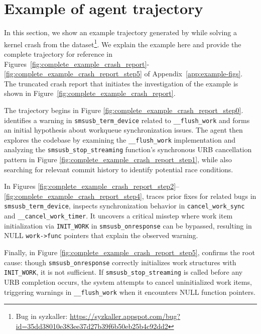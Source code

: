 \section{Example of agent trajectory}%
\label{app:examples}

In this section, we show an example \analysisphase{} trajectory generated by \cresearcher{} while solving a kernel crash from the dataset\footnote{Bug in syzkaller: \url{https://syzkaller.appspot.com/bug?id=35dd38010e383ee37d27b39f6b50eb25b4c92dd2}}.
We explain the example here and provide the complete trajectory for reference in Figures~\ref{fig:complete_example_crash_report}-\ref{fig:complete_example_crash_report_step5} of Appendix~\ref{app:example-figs}.
The truncated crash report that initiates the investigation of the example is shown in Figure~\ref{fig:complete_example_crash_report}.

The trajectory begins in Figure \ref{fig:complete_example_crash_report_step0}. \cresearcher{} identifies a warning in \verb|smsusb_term_device| related to \verb|__flush_work| and forms an initial hypothesis about workqueue synchronization issues.
The agent then  explores the codebase by examining the \verb|__flush_work| implementation and analyzing the \verb|smsusb_stop_streaming| function's synchronous URB cancellation pattern in Figure \ref{fig:complete_example_crash_report_step1}, while also searching for relevant commit history to identify potential race conditions.

In Figures \ref{fig:complete_example_crash_report_step2}–\ref{fig:complete_example_crash_report_step4}, \cresearcher{} traces prior fixes for related bugs in \verb|smsusb_term_device|,  inspects synchronization behavior in \verb|cancel_work_sync| and \verb|__cancel_work_timer|. It uncovers a critical misstep where work item initialization via \verb|INIT_WORK| in \verb|smsusb_onresponse| can be bypassed, resulting in NULL \verb|work->func| pointers that explain the observed warning.

Finally, in Figure \ref{fig:complete_example_crash_report_step5}, \cresearcher{} confirms the root cause: though \verb|smsusb_onresponse| correctly initializes work structures with \verb|INIT_WORK|, it is not sufficient. If \verb|smsusb_stop_streaming| is called before any URB completion occurs, the system attempts to cancel uninitialized work items, triggering warnings in \verb|__flush_work| when it encounters NULL function pointers.